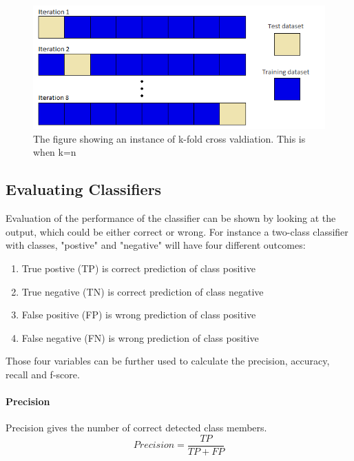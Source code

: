 \documentclass[USenglish]{ifimaster}  %
\begin{document}
\begin{figure}[h]
	\centering
	\includegraphics[scale=0.6]{Figures/Kfold}
	\caption{The figure showing an instance of k-fold cross valdiation. This is when k=n}
	\label{fig:kfold}
\end{figure}



\subsection{Evaluating Classifiers}
\label{subsec:evalclf}
Evaluation of the performance of the classifier can be shown by looking at the output, which could be either correct or wrong. For instance a two-class classifier with classes, "postive" and "negative" will have four different outcomes:

\begin{enumerate}
	\item True postive (TP) is correct prediction of class positive
	\item True negative (TN) is correct prediction of class negative
	\item False positive (FP) is wrong prediction of class positive
	\item False negative (FN) is wrong prediction of class positive
\end{enumerate}

Those four variables can be further used to calculate the precision, accuracy, recall and f-score.

\paragraph{Precision}
Precision gives the number of correct detected class members.
\begin{equation}
Precision = \frac{TP}{TP + FP}
\label{eq:prec}
\end{equation}
\end{document}
